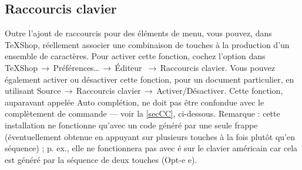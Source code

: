 \documentclass[11pt,french]{article}
\newcommand{\TS}{\textsf{\TeX Shop}}
\newcommand{\cmd}[1]{\textsf{#1}}
\newcommand{\mnu}[1]{\textsf{#1}}
\newcommand{\To}{\,\(\to\)\,}
\begin{document}
%
%



\subsection{Raccourcis clavier} 

Outre l'ajout de raccourcis pour des éléments de menu, vous pouvez, dans \TS{}, réellement associer une combinaison de touches à la production d'un ensemble de caractères. Pour activer cette fonction, cochez l'option dans  \mnu{TeXShop}\To\mnu{Préférences…}\To\mnu{Éditeur} \To\mnu{Raccourcis clavier}. Vous pouvez également activer ou désactiver cette fonction, pour un document particulier, en utilisant \mnu{Source}\To\mnu{Raccourcis clavier}\To\mnu{Activer/Désactiver}. Cette fonction, auparavant appelée Auto complétion, ne doit pas être confondue avec le complètement de commande --- voir la \cref{secCC}, ci-dessous. Remarque : cette installation ne fonctionne qu'avec un code généré par une seule frappe (éventuellement obtenue en appuyant sur plusieurs touches à la fois plutôt qu'en séquence) ; p. ex., elle ne fonctionnera pas avec é sur le clavier américain car cela est généré par la séquence de deux touches (\cmd{Opt-e e}).
\end{document}
